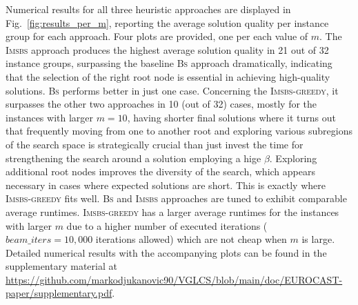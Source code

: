 \documentclass[runningheads]{llncs}
\begin{document}
  
  Numerical results for all three heuristic approaches are displayed in Fig.~\ref{fig:results_per_m}, reporting the average solution quality per instance group for each approach. Four plots are provided, one per each value of $m$. %
   The \textsc{Imsbs} approach produces the highest average solution quality in 21 out of 32 instance groups, surpassing the baseline \textsc{Bs} approach dramatically, indicating that the selection of the right root node is essential in achieving high-quality solutions.   \textsc{Bs} performs better in just one case. Concerning the \textsc{Imsbs-greedy}, it surpasses the other two approaches in 10 (out of 32) cases, mostly for the instances with larger $m=10$, having shorter final solutions where it turns out that frequently moving from one to another root and exploring various subregions of the search space is strategically crucial than just invest the time for strengthening the search around a solution employing a hige $\beta$.  Exploring additional root nodes improves the diversity of the search, which appears necessary in cases where expected solutions are short. This is exactly where  \textsc{Imsbs-greedy} fits well. 
\textsc{Bs} and \textsc{Imsbs} approaches are tuned to exhibit comparable average runtimes.  \textsc{Imsbs-greedy} has a larger average runtimes for the instances with larger $m$ due to a higher number of executed iterations ($beam\_iters = 10,000$ iterations allowed) which are not cheap when $m$ is large. Detailed numerical results with the accompanying plots can be found in the supplementary material at  \url{https://github.com/markodjukanovic90/VGLCS/blob/main/doc/EUROCAST-paper/supplementary.pdf}.  %
  	
  	
\end{document}
